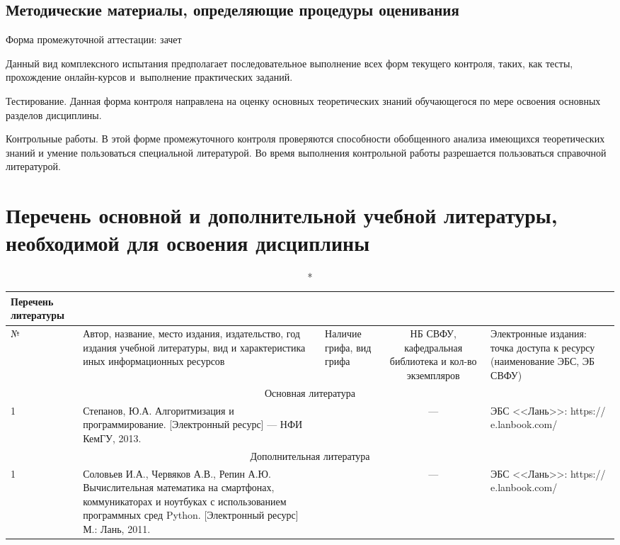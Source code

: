 \documentclass[a4paper,12pt]{article}
\begin{document}
\subsection{Методические материалы, определяющие процедуры оценивания}

Форма промежуточной аттестации: зачет
\par
Данный вид комплексного испытания предполагает последовательное выполнение
всех форм текущего контроля, таких, как тесты, прохождение онлайн-курсов
и~выполнение практических заданий.
\par
Тестирование. Данная форма контроля направлена на оценку основных
теоретических знаний обучающегося по мере освоения основных разделов дисциплины.
\par
Контрольные работы. В этой форме промежуточного контроля проверяются способности
обобщенного анализа имеющихся теоретических знаний и умение пользоваться
специальной литературой. Во время выполнения контрольной работы разрешается
пользоваться справочной литературой.



\newpage
\section{Перечень основной и дополнительной учебной литературы, необходимой для освоения дисциплины}

  \begin{longtable}{|l|p{7cm}|p{18mm}|c|p{32mm}|}
  \caption*{Перечень литературы}\\
  \hline
  № & 
  \centering\small\arraybackslash Автор, название, место издания, издательство, год издания учебной литературы, вид и характеристика иных информационных ресурсов &
  \multicolumn{1}{p{18mm}|}{\centering\small\arraybackslash Наличие грифа, вид грифа} &
  \multicolumn{1}{p{21mm}|}{\centering\small\arraybackslash НБ СВФУ, кафедральная библиотека и кол-во экземпляров} & 
  \centering\small\arraybackslash Электронные издания: точка доступа к ресурсу (наименование ЭБС, ЭБ СВФУ)\\
  \hline
  \multicolumn{5}{|c|}{Основная литература}\\
  \hline
  1 &\raggedright\arraybackslash Степанов, Ю.А. Алгоритмизация и программирование. [Электронный ресурс] — НФИ КемГУ, 2013.  &    &  ---  & ЭБС <<Лань>>: https:// e.lanbook.com/ 
  \\
  \hline
  
  \multicolumn{5}{|c|}{Дополнительная литература}\\
  \hline
  1 &\raggedright\arraybackslash Соловьев И.А., Червяков А.В., Репин А.Ю. Вычислительная математика на смартфонах, коммуникаторах и ноутбуках с использованием программных сред Python. [Электронный ресурс]  М.: Лань, 2011.  &    &  ---  & ЭБС <<Лань>>: https:// e.lanbook.com/ 
  \\
  \hline
  
  \end{longtable}
  
\end{document}
